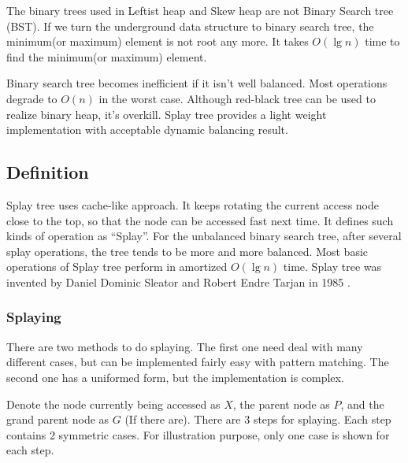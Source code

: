 \documentclass[UTF8]{article}
\begin{document}
The binary trees used in Leftist heap and Skew heap
are not Binary Search tree (BST). If we turn the underground
data structure to binary search tree, the minimum(or maximum)
element is not root any more. It takes $O(\lg n)$ time
to find the minimum(or maximum) element.

Binary search tree becomes inefficient if it isn't well
balanced. Most operations degrade to $O(n)$ in the worst case.
Although red-black tree can be used to realize
binary heap, it's overkill. Splay tree provides a light weight
implementation with acceptable dynamic balancing result.


\subsection{Definition}

Splay tree uses cache-like approach. It keeps rotating the current
access node close to the top, so that the node can be accessed fast
next time. It defines such kinds of operation as ``Splay''. For the
unbalanced binary search tree, after several splay operations, the
tree tends to be more and more balanced. Most basic operations of
Splay tree perform in amortized $O(\lg n)$ time. Splay tree was invented
by Daniel Dominic Sleator and Robert Endre Tarjan in 1985\cite{wiki-splay-tree}
\cite{self-adjusting-trees}.

\subsubsection{Splaying}

There are two methods to do splaying. The first one need deal
with many different cases, but can be implemented fairly easy with
pattern matching. The second one has a uniformed form, but the implementation
is complex.

Denote the node currently being accessed as $X$, the parent node as $P$,
and the grand parent node as $G$ (If there are).  There are 3 steps for
splaying. Each step contains 2 symmetric cases. For illustration
purpose, only one case is shown for each step.
\end{document}
